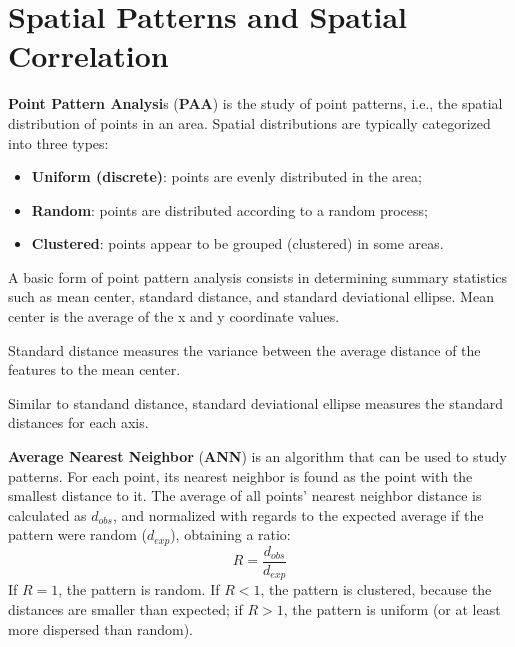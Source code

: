 \section{Spatial Patterns and Spatial Correlation}

\textbf{Point Pattern Analysi}s (\textbf{PAA}) is the study of point patterns, i.e., the spatial distribution of points in an area. Spatial distributions are typically categorized into three types:
\begin{itemize}
    \item \textbf{Uniform (discrete)}: points are evenly distributed in the area;
    \item \textbf{Random}: points are distributed according to a random process;
    \item \textbf{Clustered}: points appear to be grouped (clustered) in some areas.
\end{itemize}
A basic form of point pattern analysis consists in determining summary statistics such as mean center, standard distance, and standard deviational ellipse.
Mean center is the average of the x and y coordinate values.

Standard distance measures the variance between the average distance of the features to the mean center.

Similar to standand distance, standard deviational ellipse measures the standard distances for each axis.

\textbf{Average Nearest Neighbor} (\textbf{ANN}) is an algorithm that can be used to study patterns. For each point, its nearest neighbor is found as the point with the smallest distance to it. The average of all points' nearest neighbor distance is calculated as $d_{obs}$, and normalized with regards to the expected average if the pattern were random ($d_{exp}$), obtaining a ratio:
\begin{equation*}
    R = \frac{d_{obs}}{d_{exp}}
\end{equation*}
If $R = 1$, the pattern is random. If $R < 1$, the pattern is clustered, because the distances are smaller than expected; if $R > 1$, the pattern is uniform (or at least more dispersed than random).

